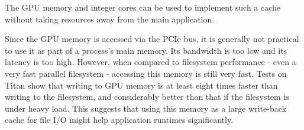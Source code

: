  The GPU memory and integer cores can be used to implement such a cache without taking resources away from the main application.


Since the GPU memory is accessed via the PCIe bus, it is generally not practical to use it as part of a process's main memory. Its bandwidth is too low and its latency is too high. However, when compared to filesystem performance - even a very fast parallel filesystem - accessing this memory is still very fast. Tests on Titan show that writing to GPU memory is at least eight times faster than writing to the filesystem, and considerably better than that if the filesystem is under heavy load. This suggests that using this memory as a large write-back cache for file I/O might help application runtimes significantly.







